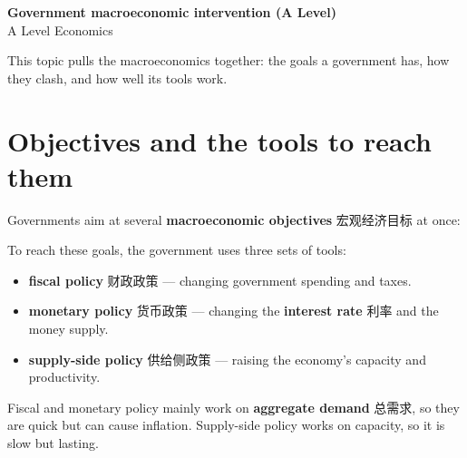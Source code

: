 \documentclass[11pt]{article}
\begin{document}
\begin{center}
  {\LARGE\bfseries Government macroeconomic intervention (A Level)}\\[0.35em]
  {\large A Level Economics}
\end{center}
\vspace{0.6em}

This topic pulls the macroeconomics together: the goals a government has, how they clash, and how well its tools work.

\section*{Objectives and the tools to reach them}

Governments aim at several \textbf{macroeconomic objectives} 宏观经济目标 at once:

\begin{center}
\end{center}

To reach these goals, the government uses three sets of tools:

\begin{itemize}
\item \textbf{fiscal policy} 财政政策 — changing government spending and taxes.

\item \textbf{monetary policy} 货币政策 — changing the \textbf{interest rate} 利率 and the money supply.

\item \textbf{supply-side policy} 供给侧政策 — raising the economy's capacity and productivity.

\end{itemize}

Fiscal and monetary policy mainly work on \textbf{aggregate demand} 总需求, so they are quick but can cause inflation. Supply-side policy works on capacity, so it is slow but lasting.
\end{document}

